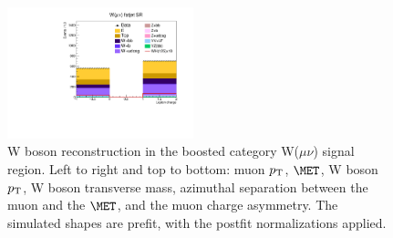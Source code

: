 \begin{figure}[tbp]
\begin{center}
    \includegraphics[width=0.48\textwidth]{figures/wlnhbb2016/boosted/WmnWHFJSR_lepton1Charge.pdf}
    \caption{W boson reconstruction in the boosted category W($\mu\nu$) signal region.
    Left to right and top to bottom: muon $p_{\mathrm{T}}$, $\MET$, W boson $p_{\mathrm{T}}$, W boson transverse mass,
    azimuthal separation between the muon and the $\MET$, and the muon charge asymmetry.
    The simulated shapes are prefit, with the postfit normalizations applied.}
    \label{fig:boost_WmnSR_WBosons}
  \end{center}
\end{figure}
\clearpage

